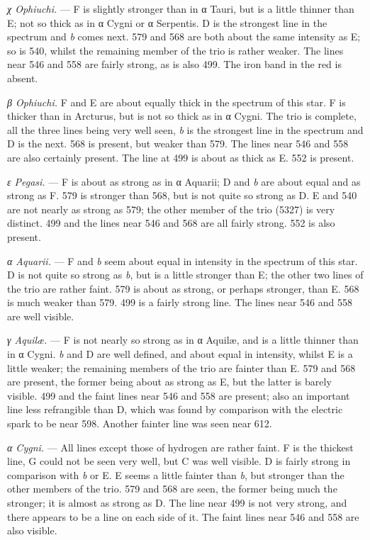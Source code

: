 \documentclass[a4paper, 12pt, oneside, polutonikogreek, english]{article}
\begin{document}
\emph{χ Ophiuchi.} --- F is slightly stronger than in α Tauri, but is a little thinner than E; not so thick as in α Cygni or α Serpentis. D is the strongest line in the spectrum and \emph{b} comes next. 579 and 568 are both about the same intensity as E; so is 540, whilst the remaining member of the trio is rather weaker. The lines near 546 and 558 are fairly strong, as is also 499. The iron band in the red is absent.

\emph{β Ophiuchi.} F and E are about equally thick in the spectrum of this star. F is thicker than in Arcturus, but is not so thick as in α Cygni. The trio is complete, all the three lines being very well seen, \emph{b} is the strongest line in the spectrum and D is the next. 568 is present, but weaker than 579. The lines near 546 and 558 are also certainly present. The line at 499 is about as thick as E. 552 is present.

\emph{ε Pegasi.} --- F is about as strong as in α Aquarii; D and \emph{b} are about equal and as strong as F. 579 is stronger than 568, but is not quite so strong as D. E and 540 are not nearly as strong as 579; the other member of the trio (5327) is very distinct. 499 and the lines near 546 and 568 are all fairly strong. 552 is also present.

\emph{α Aquarii.} --- F and \emph{b} seem about equal in intensity in the spectrum of this star. D is not quite so strong as \emph{b}, but is a little stronger than E; the other two lines of the trio are rather faint. 579 is about as strong, or perhaps stronger, than E. 568 is much weaker than 579. 499 is a fairly strong line. The lines near 546 and 558 are well visible.

\emph{γ Aquilæ.} --- F is not nearly so strong as in α Aquilæ, and is a little thinner than in α Cygni. \emph{b} and D are well defined, and about equal in intensity, whilst E is a little weaker; the remaining members of the trio are fainter than E. 579 and 568 are present, the former being about as strong as E, but the latter is barely visible. 499 and the faint lines near 546 and 558 are present; also an important line less refrangible than D, which was found by comparison with the electric spark to be near 598. Another fainter line was seen near 612.

\emph{α Cygni.} --- All lines except those of hydrogen are rather faint. F is the thickest line, G could not be seen very well, but C was well visible. D is fairly strong in comparison with \emph{b} or E. E seems a little fainter than \emph{b}, but stronger than the other members of the trio. 579 and 568 are seen, the former being much the stronger; it is almost as strong as D. The line near 499 is not very strong, and there appears to be a line on each side of it. The faint lines near 546 and 558 are also visible.
\end{document}
